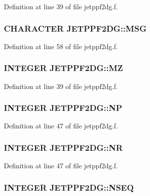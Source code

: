 Definition at line 39 of file jetppf2dg.f.\hypertarget{namespaceJETPPF2DG_90aaa1a998c6e80c66375bf2e0f4cc2f}{
\subsubsection[MSG]{\setlength{\rightskip}{0pt plus 5cm}CHARACTER {\bf JETPPF2DG::MSG}}}
\label{namespaceJETPPF2DG_90aaa1a998c6e80c66375bf2e0f4cc2f}




Definition at line 58 of file jetppf2dg.f.\hypertarget{namespaceJETPPF2DG_887113770833f9aa581604f9474cb44c}{
\subsubsection[MZ]{\setlength{\rightskip}{0pt plus 5cm}INTEGER {\bf JETPPF2DG::MZ}}}
\label{namespaceJETPPF2DG_887113770833f9aa581604f9474cb44c}




Definition at line 39 of file jetppf2dg.f.\hypertarget{namespaceJETPPF2DG_fc3e107505ebc9c764214d171a22c579}{
\subsubsection[NP]{\setlength{\rightskip}{0pt plus 5cm}INTEGER {\bf JETPPF2DG::NP}}}
\label{namespaceJETPPF2DG_fc3e107505ebc9c764214d171a22c579}




Definition at line 47 of file jetppf2dg.f.\hypertarget{namespaceJETPPF2DG_177fa052b15bf74d1b04fa4c6d0d246d}{
\subsubsection[NR]{\setlength{\rightskip}{0pt plus 5cm}INTEGER {\bf JETPPF2DG::NR}}}
\label{namespaceJETPPF2DG_177fa052b15bf74d1b04fa4c6d0d246d}




Definition at line 47 of file jetppf2dg.f.\hypertarget{namespaceJETPPF2DG_1e11ff274dde21dbe30d2bb886dfd5b9}{
\subsubsection[NSEQ]{\setlength{\rightskip}{0pt plus 5cm}INTEGER {\bf JETPPF2DG::NSEQ}}}
\label{namespaceJETPPF2DG_1e11ff274dde21dbe30d2bb886dfd5b9}





